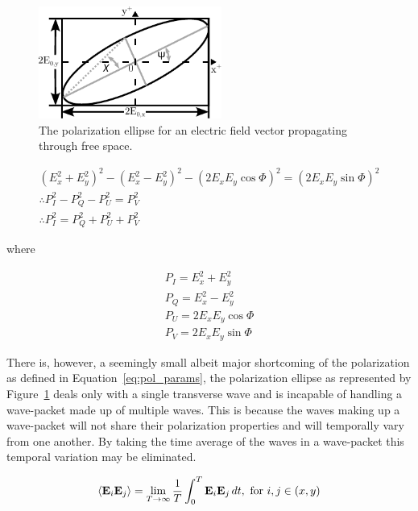 \begin{figure}[t]
    \centering
    \includegraphics[width=6cm]{figures/2_pol_ellipse.pdf}
    \caption{The polarization ellipse for an electric field vector propagating through free space.}
    \label{fig:pol_ellipse}
\end{figure}


\begin{gather*}
    (E_{x}^{2} + E_{y}^{2})^{2} - (E_{x}^{2} - E_{y}^{2})^{2} - (2 E_{x} E_{y} \cos \Phi)^{2} = (2 E_{x} E_{y} \sin \Phi)^{2} \\
    \therefore P_{I}^{2} - P_{Q}^{2} - P_{U}^{2} = P_{V}^{2} \\
    \therefore P_{I}^{2} = P_{Q}^{2} + P_{U}^{2} + P_{V}^{2}
\end{gather*}

\noindent where

\begin{equation}
    \begin{gathered}
        P_{I} = E_{x}^{2} + E_{y}^{2} \\
        P_{Q} = E_{x}^{2} - E_{y}^{2} \\
        P_{U} = 2 E_{x} E_{y} \cos \Phi \\
        P_{V} = 2 E_{x} E_{y} \sin \Phi
    \end{gathered}
    \label{eq:pol_params}
\end{equation}
\prgph

There is, however, a seemingly small albeit major shortcoming of the polarization as defined in Equation~\ref{eq:pol_params}, the polarization ellipse as represented by Figure~\ref{fig:pol_ellipse} deals only with a single transverse wave and is incapable of handling a wave-packet made up of multiple waves. This is because the waves making up a wave-packet will not share their polarization properties and will temporally vary from one another. By taking the time average of the waves in a wave-packet this temporal variation may be eliminated.

\begin{equation}
    \left< \mathbf{E}_{i} \mathbf{E}_{j} \right> = \lim_{T \rightarrow \infty} \frac{1}{T} \int_{0}^{T} \mathbf{E}_{i} \mathbf{E}_{j}\,dt, \text{ for } i, j \in (x, y)
\end{equation}

